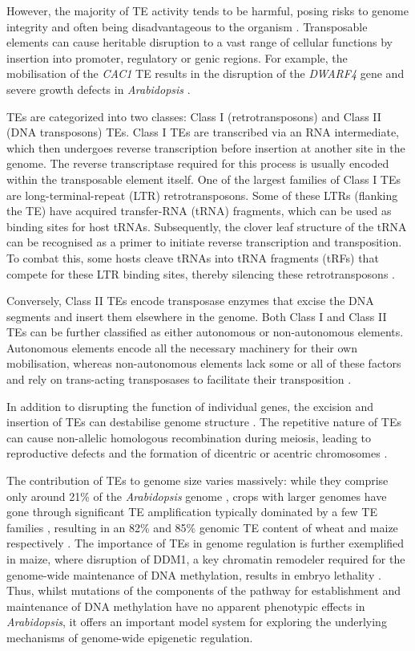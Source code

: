 However, the majority of TE activity tends to be harmful, posing risks to genome integrity and often being disadvantageous to the organism \cite{RN103}. Transposable elements can cause heritable disruption to a vast range of cellular functions by insertion into promoter, regulatory or genic regions. For example, the mobilisation of the \textit{CAC1} TE results in the disruption of the \textit{DWARF4}  gene and severe growth defects in \textit{Arabidopsis} \cite{RN105}.

TEs are categorized into two classes: Class I (retrotransposons) and Class II (DNA transposons) TEs. Class I TEs are transcribed via an RNA intermediate, which then undergoes reverse transcription before insertion at another site in the genome. The reverse transcriptase required for this process is usually encoded within the transposable element itself. One of the largest families of Class I TEs are long-terminal-repeat (LTR) retrotransposons. Some of these LTRs (flanking the TE) have acquired transfer-RNA (tRNA) fragments, which can be used as binding sites for host tRNAs. Subsequently, the clover leaf structure of the tRNA can be recognised as a primer to initiate reverse transcription and transposition. To combat this, some hosts cleave tRNAs into tRNA fragments (tRFs) that compete for these LTR binding sites, thereby silencing these retrotransposons \cite{RN66,RN67,RN68}.

Conversely, Class II TEs encode transposase enzymes that excise the DNA segments and insert them elsewhere in the genome.  Both Class I and Class II TEs can be further classified as either autonomous or non-autonomous elements. Autonomous elements encode all the necessary machinery for their own mobilisation, whereas non-autonomous elements lack some or all of these factors and rely on trans-acting transposases to facilitate their transposition \cite{RN106,RN107}.

In addition to disrupting the function of individual genes, the excision and insertion of TEs can destabilise genome structure \cite{RN103}. The repetitive nature of TEs can cause non-allelic homologous recombination during meiosis, leading to reproductive defects and the formation of dicentric or acentric chromosomes \cite{RN108}. 

The contribution of TEs to genome size varies massively: while they comprise only around 21\% of the \textit{Arabidopsis} genome \cite{RN109},  crops with larger genomes have gone through significant TE amplification typically dominated by a few TE families \cite{RN110,RN113}, resulting in an 82\% and 85\% genomic TE content of wheat and maize respectively \cite{RN110,RN111}. The importance of TEs in genome regulation is further exemplified in maize, where disruption of DDM1, a key chromatin remodeler required for the genome-wide maintenance of DNA methylation, results in embryo lethality \cite{RN112}. Thus, whilst mutations of the components of the pathway for establishment and maintenance of DNA methylation have no apparent phenotypic effects in \textit{Arabidopsis}, it offers an important model system for exploring the underlying mechanisms of genome-wide epigenetic regulation.

